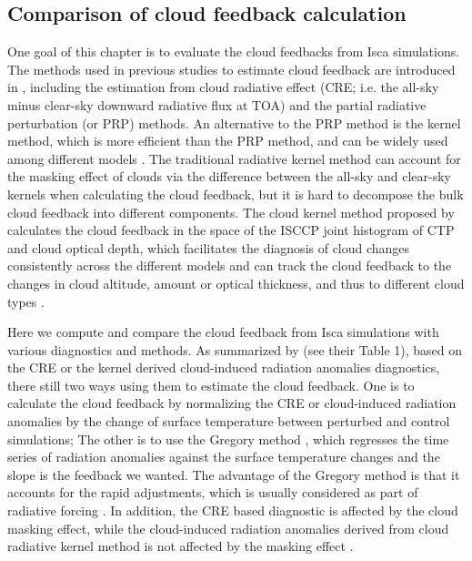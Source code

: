 
\subsection{Comparison of cloud feedback calculation}
\label{sec:cmp_cld_fbk_method_result}

One goal of this chapter is to evaluate the cloud feedbacks from Isca simulations. The methods used in previous studies to estimate cloud feedback are introduced in , including the estimation from cloud radiative effect (CRE; i.e. the all-sky minus clear-sky downward radiative flux at TOA) and the partial radiative perturbation (or PRP) methods. An alternative to the PRP method is the kernel method, which is more efficient than the PRP method, and can be widely used among different models \citep{Soden2006,Soden2008}. The traditional radiative kernel method can account for the masking effect of clouds via the difference between the all-sky and clear-sky kernels when calculating the cloud feedback, but it is hard to decompose the bulk cloud feedback into different components. The cloud kernel method proposed by \cite{Zelinka2012computing1,Zelinka2012computing2} calculates the cloud feedback in the space of the ISCCP joint histogram of CTP and cloud optical depth, which facilitates the diagnosis of cloud changes consistently across the different models and can track the cloud feedback to the changes in cloud altitude, amount or optical thickness, and thus to different cloud types \citep{Siebesma2020clouds}. 

Here we compute and compare the cloud feedback from Isca simulations with various diagnostics and methods. As summarized by \cite{Zelinka2013} (see their Table 1), based on the CRE or the kernel derived cloud-induced radiation anomalies diagnostics, there still two ways using them to estimate the cloud feedback. One is to calculate the cloud feedback by normalizing the CRE or cloud-induced radiation anomalies by the change of surface temperature between perturbed and control simulations; The other is to use the Gregory method \citep{Gregory2004}, which regresses the time series of radiation anomalies against the surface temperature changes and the slope is the feedback we wanted. The advantage of the Gregory method is that it accounts for the rapid adjustments, which is usually considered as part of radiative forcing \citep{Andrews2012cloud,Siebesma2020clouds}. In addition, the CRE based diagnostic is affected by the cloud masking effect, while the cloud-induced radiation anomalies derived from cloud radiative kernel method is not affected by the masking effect \citep{Zelinka2013}.

